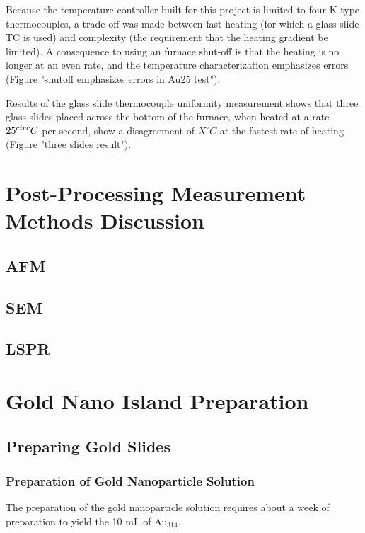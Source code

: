 \documentclass[12pt,oneside,english]{article}
\begin{document}
	Because the temperature controller built for this project is limited to four K-type thermocouples, a trade-off was made between fast heating (for which a glass slide TC is used) and complexity (the requirement that the heating gradient be limited). 
	A consequence to using an furnace shut-off is that the heating is no longer at an even rate, and the temperature characterization emphasizes errors (Figure "shutoff emphasizes errors in Au25 test").

	Results of the glass slide thermocouple uniformity measurement shows that three glass slides placed across the bottom of the furnace, when heated at a rate $25^{\/circ}C$ per second, show a disagreement of $X^{\circ}C$ at the fastest rate of heating (Figure "three slides result").

	\clearpage
	
	\section{ Post-Processing Measurement Methods Discussion }
	\subsection{AFM}
	\subsection{SEM}
	\subsection{LSPR}



	\section{Gold Nano Island Preparation}	

	\subsection{Preparing Gold Slides}
	
	\subsubsection{Preparation of Gold Nanoparticle Solution}
	The preparation of the gold nanoparticle solution requires about a week of preparation to yield the 10 mL of Au$_{314}$.
	
\end{document}
